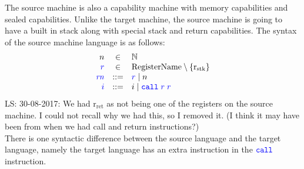 \documentclass[a4paper]{article}
\newcommand\lau[1]{{\color{purple} \sf \footnotesize {LS: #1}}\\}
\newcommand{\defbnf}{::=}
\newcommand{\sourcecolor}{\color{blue}}
\newcommand{\src}[1]{{\sourcecolor #1}}
\newcommand{\targetcolor}[1]{\color{black}}
\newcommand{\trg}[1]{{\targetcolor{} #1}}
\newcommand{\zinstr}[1]{\texttt{#1}}
\newcommand{\twoinstr}[3]{
  \ifthenelse{\equal{#2#3}{}}
  {\zinstr{#1}}
  {\zinstr{#1} \; #2 \; #3}
}
\newcommand{\scall}[2]{\twoinstr{\src{call}}{#1}{#2}}
\newcommand{\nats}{\mathbb{N}}
\newcommand{\shareddom}[1]{\mathrm{#1}}
\newcommand{\RegName}{\shareddom{RegisterName}}
\newcommand{\var}[1]{\mathit{#1}}
\newcommand{\rn}{\var{rn}}
\newcommand{\rstk}{\mathrm{r}_\mathrm{stk}}
\newcommand{\rO}{\mathrm{r}_\mathrm{ret}}
\newcommand{\rret}{\rO}
\begin{document}
The source machine is also a capability machine with memory capabilities and sealed capabilities. Unlike the target machine, the source machine is going to have a built in stack along with special stack and return capabilities. The syntax of the source machine language is as follows:
\[
  \begin{array}{rcl}
    n & \in & \nats \\
    \src{r} &\in &  \RegName \setminus \{\rstk\}\\
    \src{\rn} &\defbnf & \src{r} \mid n \\
    \src{i} & \defbnf &  \trg{i} \mid \scall{\src{r}}{\src{r}}
  \end{array}
\]
\lau{30-08-2017: We had $\rret$ as not being one of the registers on the source machine. I could not recall why we had this, so I removed it. (I think it may have been from when we had call and return instructions?)}
There is one syntactic difference between the source language and the target language, namely the target language has an extra instruction in the $\scall{}{}$ instruction.
\end{document}
